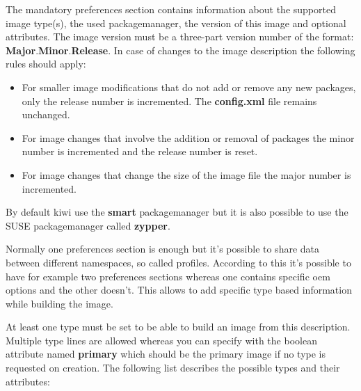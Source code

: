 The mandatory preferences section contains information about the supported
image type(s), the used packagemanager, the version of this image and
optional attributes. The image version must be a three-part version number of
the format: \textbf{Major}.\textbf{Minor}.\textbf{Release}. In case of
changes to the image description the following rules should apply:

\begin{itemize}
\item For smaller image modifications that do not add or remove any
      new packages, only the release number is incremented.
      The \textbf{config.xml} file remains unchanged.
\item For image changes that involve the addition or removal of packages
      the minor number is incremented and the release number is reset.
\item For image changes that change the size of the image file
      the major number is incremented.
\end{itemize}

By default kiwi use the \textbf{smart} packagemanager but it is also possible
to use the SUSE packagemanager called \textbf{zypper}. 

Normally one preferences section is enough but it's possible to share
data between different namespaces, so called profiles. According to this
it's possible to have for example two preferences sections whereas one
contains specific oem options and the other doesn't. This allows to
add specific type based information while building the image.

At least one type must be set to be able to build an image from
this description. Multiple type lines are allowed whereas you can specify
with the boolean attribute named \textbf{primary} which should be the primary
image if no type is requested on creation. The following list
describes the possible types and their attributes:

